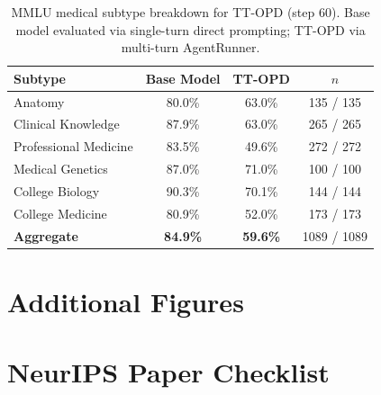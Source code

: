\documentclass{article}
\begin{document}
\begin{table}[h]
\centering
\caption{MMLU medical subtype breakdown for TT-OPD (step 60). Base model evaluated via single-turn direct prompting; TT-OPD via multi-turn AgentRunner.}
\label{tab:mmlu_subtypes}
\small
\begin{tabular}{lccc}
\toprule
\textbf{Subtype} & \textbf{Base Model} & \textbf{TT-OPD} & \textbf{$n$} \\
\midrule
Anatomy & 80.0\% & 63.0\% & 135 / 135 \\
Clinical Knowledge & 87.9\% & 63.0\% & 265 / 265 \\
Professional Medicine & 83.5\% & 49.6\% & 272 / 272 \\
Medical Genetics & 87.0\% & 71.0\% & 100 / 100 \\
College Biology & 90.3\% & 70.1\% & 144 / 144 \\
College Medicine & 80.9\% & 52.0\% & 173 / 173 \\
\midrule
\textbf{Aggregate} & \textbf{84.9\%} & \textbf{59.6\%} & 1089 / 1089 \\
\bottomrule
\end{tabular}
\end{table}


\section{Additional Figures}
\label{app:additional_figures}




\newpage
\section*{NeurIPS Paper Checklist}
\end{document}
